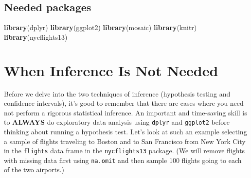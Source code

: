 \documentclass[]{tufte-book}
\newenvironment{Shaded}{\begin{snugshade}}{\end{snugshade}}
\newcommand{\KeywordTok}[1]{\textcolor[rgb]{0.13,0.29,0.53}{\textbf{{#1}}}}
\newcommand{\DecValTok}[1]{\textcolor[rgb]{0.00,0.00,0.81}{{#1}}}
\newcommand{\StringTok}[1]{\textcolor[rgb]{0.31,0.60,0.02}{{#1}}}
\newcommand{\NormalTok}[1]{{#1}}
\begin{document}
\subsection*{Needed packages}\label{needed-packages-4}

\begin{Shaded}
\begin{Highlighting}[]
\KeywordTok{library}\NormalTok{(dplyr)}
\KeywordTok{library}\NormalTok{(ggplot2)}
\KeywordTok{library}\NormalTok{(mosaic)}
\KeywordTok{library}\NormalTok{(knitr)}
\KeywordTok{library}\NormalTok{(nycflights13)}
\end{Highlighting}
\end{Shaded}

\section{When Inference Is Not
Needed}\label{when-inference-is-not-needed}

Before we delve into the two techniques of inference (hypothesis testing
and confidence intervals), it's good to remember that there are cases
where you need not perform a rigorous statistical inference. An
important and time-saving skill is to \textbf{ALWAYS} do exploratory
data analysis using \texttt{dplyr} and \texttt{ggplot2} before thinking
about running a hypothesis test. Let's look at such an example selecting
a sample of flights traveling to Boston and to San Francisco from New
York City in the \texttt{flights} data frame in the
\texttt{nycflights13} package. (We will remove flights with missing data
first using \texttt{na.omit} and then sample 100 flights going to each
of the two airports.)

\begin{Shaded}
\end{Shaded}
\end{document}
